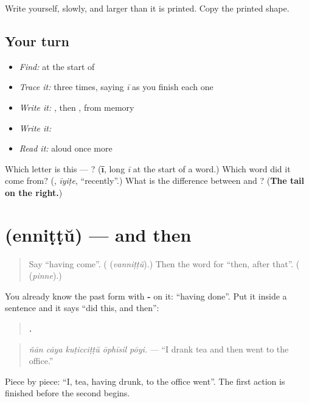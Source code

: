 Write \textbf{} yourself, slowly, and larger than it is printed. Copy the printed shape.

\subsection*{Your turn}
\begin{itemize}
\raggedright
  \item \emph{Find:}  at the start of \textbf{}
  \item \emph{Trace it:}  three times, saying \emph{ī} as you finish each one
  \item \emph{Write it:} , then , from memory
  \item \emph{Write it:} \textbf{}
  \item \emph{Read it:} \textbf{} aloud once more
\end{itemize}

\begin{tcolorbox}[breakable,colback=teal!4,colframe=teal!35!black,title={Before you move on}]
Which letter is this — ? (\textbf{ī}, long \emph{ī} at the start of a word.) Which word did it come from? (\textbf{}, \emph{īyiṭe}, \textquotedblleft{}recently\textquotedblright{}.) What is the difference between  and ? (\textbf{The tail on the right.})
\end{tcolorbox}
\section[\texorpdfstring{\ml{എന്നിട്ട്} (enniṭṭŭ)}{എന്നിട്ട് (enniṭṭŭ)}]{ (enniṭṭŭ) — and then}

\label{lesson:ML-C340-ennittu}



\begin{quote}
Say \textquotedblleft{}having come\textquotedblright{}. (\textbf{} (\emph{vanniṭṭŭ}).) Then the word for \textquotedblleft{}then, after that\textquotedblright{}. (\textbf{} (\emph{pinne}).)
\end{quote}

\begin{grammarlens}[title={Grammar Lens: one sentence, with -\ml{ഇട്ട്}}]
You already know the past form with \textbf{-} on it: \textquotedblleft{}having done\textquotedblright{}. Put it inside a sentence and it says \textquotedblleft{}did this, and then\textquotedblright{}:

\begin{quote}
\textbf{    .}
\end{quote}

\begin{quote}
\emph{ñān cāya kuṭicciṭṭŭ ōphīsil pōyi.} — \textquotedblleft{}I drank tea and then went to the office.\textquotedblright{}
\end{quote}

Piece by piece: \textquotedblleft{}I, tea, having drunk, to the office went\textquotedblright{}. The first action is finished before the second begins.
\end{grammarlens}

